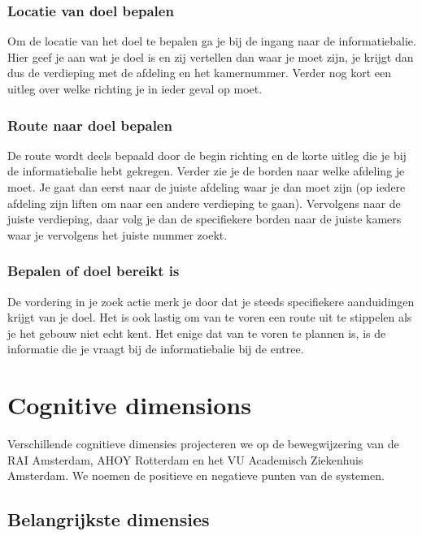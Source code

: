 \subsubsection{Locatie van doel bepalen}

Om de locatie van het doel te bepalen ga je bij de ingang naar de informatiebalie. Hier geef je aan wat je doel is en zij vertellen dan waar je moet zijn, je krijgt dan dus de verdieping met de afdeling en het kamernummer. Verder nog kort een uitleg over welke richting je in ieder geval op moet.


\subsubsection{Route naar doel bepalen}

De route wordt deels bepaald door de begin richting en de korte uitleg die je bij de informatiebalie hebt gekregen. Verder zie je de borden naar welke afdeling je moet. Je gaat dan eerst naar de juiste afdeling waar je dan moet zijn (op iedere afdeling zijn liften om naar een andere verdieping te gaan). Vervolgens naar de juiste verdieping, daar volg je dan de specifiekere borden naar de juiste kamers waar je vervolgens het juiste nummer zoekt.


\subsubsection{Bepalen of doel bereikt is}

De vordering in je zoek actie merk je door dat je steeds specifiekere aanduidingen krijgt van je doel. Het is ook lastig om van te voren een route uit te stippelen als je het gebouw niet echt kent. Het enige dat van te voren te plannen is, is de informatie die je vraagt bij de informatiebalie bij de entree.


\section{Cognitive dimensions}

Verschillende cognitieve dimensies projecteren we op de bewegwijzering van de RAI Amsterdam, AHOY Rotterdam en het VU Academisch Ziekenhuis Amsterdam. We noemen de positieve en negatieve punten van de systemen.


\subsection{Belangrijkste dimensies} \label{sectie:cd_demensies}


